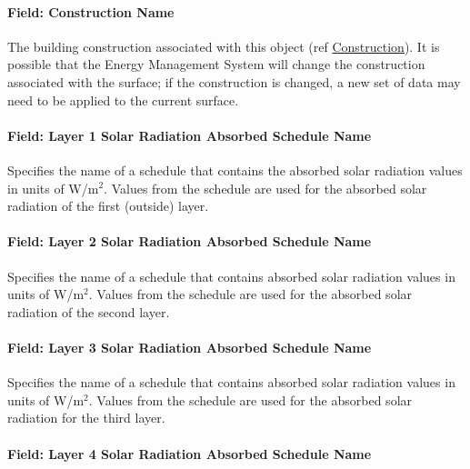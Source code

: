 \paragraph{Field: Construction Name}\label{field-construction-name-2}

The building construction associated with this object (ref \hyperref[construction-000]{Construction}). It is possible that the Energy Management System will change the construction associated with the surface; if the construction is changed, a new set of data may need to be applied to the current surface.

\paragraph{Field: Layer 1 Solar Radiation Absorbed Schedule Name}\label{field-layer-1-solar-radiation-absorbed-schedule-name}

Specifies the name of a schedule that contains the absorbed solar radiation values in units of W/m\(^{2}\). Values from the schedule are used for the absorbed solar radiation of the first (outside) layer.

\paragraph{Field: Layer 2 Solar Radiation Absorbed Schedule Name}\label{field-layer-2-solar-radiation-absorbed-schedule-name}

Specifies the name of a schedule that contains absorbed solar radiation values in units of W/m\(^{2}\). Values from the schedule are used for the absorbed solar radiation of the second layer.

\paragraph{Field: Layer 3 Solar Radiation Absorbed Schedule Name}\label{field-layer-3-solar-radiation-absorbed-schedule-name}

Specifies the name of a schedule that contains absorbed solar radiation values in units of W/m\(^{2}\). Values from the schedule are used for the absorbed solar radiation for the third layer.

\paragraph{Field: Layer 4 Solar Radiation Absorbed Schedule Name}\label{field-layer-4-solar-radiation-absorbed-schedule-name}

